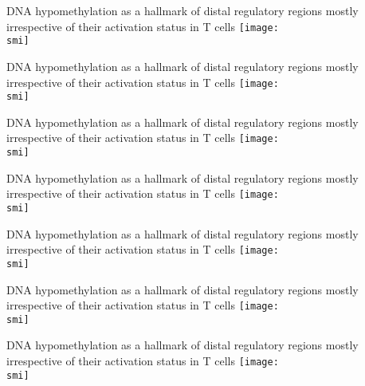 \documentclass[10pt]{beamer}
\def\smi{out/ln/updir/mw-gcthesis-oral/library.bib}
\begin{document}
\begin{frame}{DNA hypomethylation as a hallmark of distal regulatory regions mostly irrespective of their activation status in T cells}
  \def\smi{out/ln/updir/mw-gcthesis-oral/ink/h3k27ac-clusters/2.pdf}
  \texttt{[image: \\smi]}
\end{frame}
\begin{frame}{DNA hypomethylation as a hallmark of distal regulatory regions mostly irrespective of their activation status in T cells}
  \def\smi{out/ln/updir/mw-gcthesis-oral/ink/h3k27ac-clusters/3.pdf}
  \texttt{[image: \\smi]}
\end{frame}
\begin{frame}{DNA hypomethylation as a hallmark of distal regulatory regions mostly irrespective of their activation status in T cells}
  \def\smi{out/ln/updir/mw-gcthesis-oral/ink/h3k27ac-clusters/4.pdf}
  \texttt{[image: \\smi]}
\end{frame}
\begin{frame}{DNA hypomethylation as a hallmark of distal regulatory regions mostly irrespective of their activation status in T cells}
  \def\smi{out/ln/updir/mw-gcthesis-oral/ink/h3k27ac-clusters/5.pdf}
  \texttt{[image: \\smi]}
\end{frame}
\begin{frame}{DNA hypomethylation as a hallmark of distal regulatory regions mostly irrespective of their activation status in T cells}
  \def\smi{out/ln/updir/mw-gcthesis-oral/ink/chromatin-states/genome-view/enhancers/1.pdf}
  \texttt{[image: \\smi]}
\end{frame}
\begin{frame}{DNA hypomethylation as a hallmark of distal regulatory regions mostly irrespective of their activation status in T cells}
  \def\smi{out/ln/updir/mw-gcthesis-oral/ink/chromatin-states/genome-view/enhancers/2.pdf}
  \texttt{[image: \\smi]}
\end{frame}
\begin{frame}{DNA hypomethylation as a hallmark of distal regulatory regions mostly irrespective of their activation status in T cells}
  \def\smi{out/ln/updir/mw-gcthesis-oral/ink/chromatin-states/genome-view/enhancers/3.pdf}
  \texttt{[image: \\smi]}
\end{frame}
\end{document}
